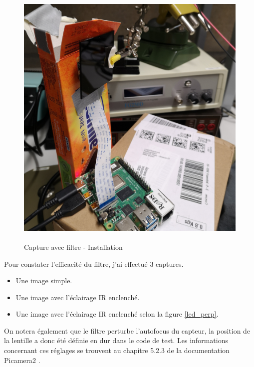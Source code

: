 \begin{figure}[H]
    \centering
    \includegraphics[height=13cm]{assets/figures/filtre.jpg}
    \caption{Capture avec filtre - Installation}
\end{figure}

Pour constater l'efficacité du filtre, j'ai effectué 3 captures.
\begin{itemize}
    \item Une image simple.
    \item Une image avec l'éclairage IR enclenché.
    \item Une image avec l'éclairage IR enclenché selon la figure \ref{led_perp}.
\end{itemize}
On notera également que le filtre perturbe l'autofocus du capteur, la position de la lentille a donc été définie en dur dans le code de test.
Les informations concernant ces réglages se trouvent au chapitre 5.2.3 de la documentation Picamera2 \cite{picamera2}.

